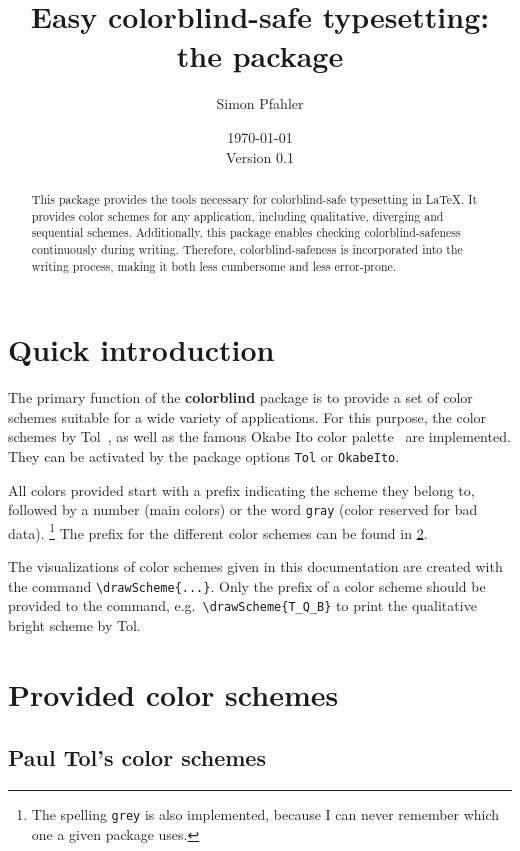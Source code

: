 \documentclass{article}
\title{Easy colorblind-safe typesetting:\\ the \colorblind package}
\author{Simon Pfahler}
\date{\today\\Version 0.1}
\newcommand\colorblind{\textbf{colorblind} }
\newcommand\marg[1]{\leavevmode\marginpar{\raggedleft #1}}
\begin{document}
\maketitle

\begin{abstract}
    This package provides the tools necessary for colorblind-safe typesetting in \LaTeX.
    It provides color schemes for any application, including qualitative, diverging and sequential schemes.
    Additionally, this package enables checking colorblind-safeness continuously during writing.
    Therefore, colorblind-safeness is incorporated into the writing process, making it both less cumbersome and less error-prone.
\end{abstract}

\tableofcontents

\section{Quick introduction}
\cprotect\marg{\verb!Tol!\\\verb!OkabeIto!}%
The primary function of the \colorblind package is to provide a set of color schemes suitable for a wide variety of applications.
For this purpose, the color schemes by Tol~\cite{Tol}, as well as the famous Okabe Ito color palette~\cite{Ichihara_2008} are implemented.
They can be activated by the package options \verb!Tol! or \verb!OkabeIto!.

All colors provided start with a prefix indicating the scheme they belong to, followed by a number (main colors) or the word \verb!gray! (color reserved for bad data).%
\cprotect\footnote{%
    The spelling \verb!grey! is also implemented, because I can never remember which one a given package uses.
}
The prefix for the different color schemes can be found in \cref{sec:colors}.

\cprotect\marg{\verb!\drawScheme{...}!}%
The visualizations of color schemes given in this documentation are created with the command \verb!\drawScheme{...}!.
Only the prefix of a color scheme should be provided to the command, e.g.\ \verb!\drawScheme{T_Q_B}! to print the qualitative bright scheme by Tol.


\section{Provided color schemes}\label{sec:colors}

\subsection{Paul Tol's color schemes}
\end{document}

